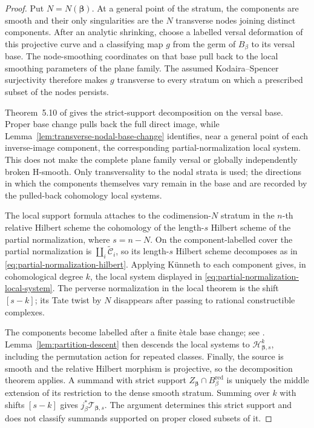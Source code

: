 \documentclass[11pt,reqno]{amsart}
\theoremstyle{definition}
\newcommand{\red}{\mathrm{red}}
\begin{document}
\begin{proof}
Put $N=N(\boldsymbol\beta)$.  At a general point of the stratum, the
components are smooth and their only singularities are the $N$ transverse
nodes joining distinct components.  After an analytic shrinking, choose a
labelled versal deformation of this projective curve and a classifying map
$g$ from the germ of $B_\beta$ to its versal base.  The node-smoothing
coordinates on that base pull back to the local smoothing parameters of the
plane family.  The assumed Kodaira--Spencer surjectivity therefore makes
$g$ transverse to every stratum on which a prescribed subset of the nodes
persists.

Theorem~5.10 of \cite{MSV} gives the strict-support decomposition on the
versal base.  Proper base change pulls back the full direct image, while
Lemma~\ref{lem:transverse-nodal-base-change} identifies, near a general
point of each inverse-image component, the corresponding
partial-normalization local system.
This does not make the complete plane family versal or globally
independently broken H-smooth.  Only transversality to the nodal strata is
used; the directions in which the components themselves vary remain in the
base and are recorded by the pulled-back cohomology local systems.

The local support formula attaches to the codimension-$N$ stratum in the
$n$-th relative Hilbert scheme the cohomology of the length-$s$ Hilbert
scheme of the partial normalization, where $s=n-N$.  On the
component-labelled cover the partial normalization is
$\coprod_i\widetilde{\mathcal C}_i$, so its length-$s$ Hilbert scheme
decomposes as in \eqref{eq:partial-normalization-hilbert}.  Applying K\"unneth
to each component gives, in cohomological degree $k$, the local system
displayed in \eqref{eq:partial-normalization-local-system}.  The perverse
normalization in the local theorem is the shift $[s-k]$; its Tate twist by
$N$ disappears after passing to rational constructible complexes.

The components become labelled after a finite \`etale base change; see
\cite[Proposition~5.4]{MSV}.  Lemma~\ref{lem:partition-descent} then
descends the local systems to $\mathcal H_{\boldsymbol\beta,s}^k$, including
the permutation action for repeated classes.  Finally, the source is smooth and
the relative Hilbert morphism is projective, so the decomposition theorem
applies.  A summand with strict support
$Z_{\boldsymbol\beta}\cap B_\beta^{\red}$ is uniquely the middle extension
of its restriction to the dense smooth stratum.  Summing over $k$ with
shifts $[s-k]$ gives $j_\beta^*\mathcal T_{\boldsymbol\beta,s}$.  The
argument determines this strict support and does not classify summands
supported on proper closed subsets of it.
\end{proof}
\end{document}
